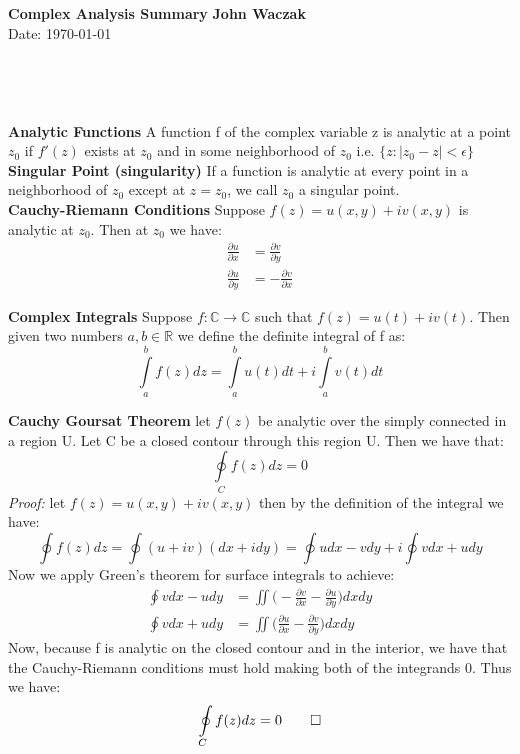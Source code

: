 \documentclass[a4paper, 11pt]{article}
\begin{document}
\noindent
\large\textbf{Complex Analysis Summary} \hfill \textbf{John Waczak} \\ 
Date: \today \\ \\ \\ \\ \\
\noindent\textbf{Analytic Functions} A function f of the complex variable z is analytic at a point $z_0$ if $f'(z)$ exists at $z_0$ and in some neighborhood of $z_0$ i.e. $\{z:|z_0-z|< \epsilon\}$ \\ 

\noindent\textbf{Singular Point (singularity)} If a function is analytic at every point in a neighborhood of $z_0$ except at $z=z_0$, we call $z_0$ a singular point.\\

\noindent\textbf{Cauchy-Riemann Conditions} Suppose $f(z) = u(x,y) + iv(x,y)$ is analytic at $z_0$. Then at $z_0$ we have: 
\begin{align*}
	\frac{\partial u}{\partial x} &= \frac{\partial v}{\partial y}	\\
	\frac{\partial u}{\partial y} &= -\frac{\partial v}{\partial x}
\end{align*}

\noindent\textbf{Complex Integrals} Suppose $f: \mathbb{C}\rightarrow \mathbb{C}$ such that $f(z) = u(t) + iv(t)$. Then given two numbers $a,b \in \mathbb{R}$ we define the definite integral of f as: 
\begin{equation*}
	\int\limits_a^b f(z)dz = \int\limits_a^b u(t) dt + i\int\limits_a^b v(t) dt
\end{equation*}

\noindent\textbf{Cauchy Goursat Theorem} let $f(z)$ be analytic over the simply connected in a region U. Let C be a closed contour through this region U. Then we have that: 
\begin{equation*}
	\oint\limits_C f(z)dz = 0 
\end{equation*}
\textit{Proof:} let $f(z) = u(x,y)+iv(x,y)$ then by the definition of the integral we have: 
\begin{equation*}
	\oint f(z)dz = \oint (u+iv)(dx + idy) = \oint udx - vdy + i\oint vdx + udy 
\end{equation*}
Now we apply Green's theorem for surface integrals to achieve: 
\begin{align*}
	\oint vdx -udy &= \iint \bigg( -\frac{\partial v}{\partial x}- \frac{\partial u}{\partial y} \bigg) dxdy \\
	\oint vdx + udy &= \iint \bigg( \frac{\partial u}{\partial x} - \frac{\partial v}{\partial y} \bigg) dxdy
\end{align*}
Now, because f is analytic on the closed contour and in the interior, we have that the Cauchy-Riemann conditions must hold making both of the integrands 0. Thus we have: 
\begin{equation*}
	\oint\limits_C f(z)dz = 0 \qed
\end{equation*}
\end{document}
